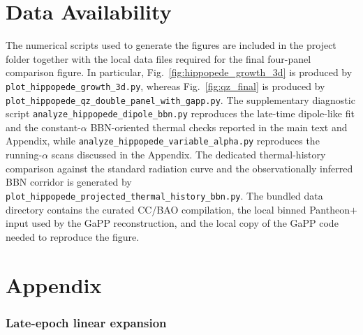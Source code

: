 \documentclass[11pt]{article}
\newcommand{\blue}[1]{{\color{blue}#1}}
\begin{document}

\section*{\blue{Data Availability}}

\blue{The numerical scripts used to generate the figures are included in the project folder together with the local data files required for the final four-panel comparison figure. In particular, Fig.~\ref{fig:hippopede_growth_3d} is produced by \texttt{plot\_hippopede\_growth\_3d.py}, whereas Fig.~\ref{fig:qz_final} is produced by \texttt{plot\_hippopede\_qz\_double\_panel\_with\_gapp.py}. The supplementary diagnostic script \texttt{analyze\_hippopede\_dipole\_bbn.py} reproduces the late-time dipole-like fit and the constant-$\alpha$ BBN-oriented thermal checks reported in the main text and Appendix, while \texttt{analyze\_hippopede\_variable\_alpha.py} reproduces the running-$\alpha$ scans discussed in the Appendix. The dedicated thermal-history comparison against the standard radiation curve and the observationally inferred BBN corridor is generated by \texttt{plot\_hippopede\_projected\_thermal\_history\_bbn.py}. The bundled data directory contains the curated CC/BAO compilation, the local binned Pantheon$+$ input used by the GaPP reconstruction, and the local copy of the GaPP code needed to reproduce the figure.}





\section*{Appendix}

\subsubsection*{Late-epoch linear expansion}
\end{document}
